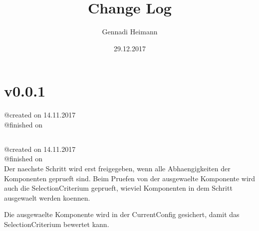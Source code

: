 \documentclass{article}
\begin{document}
\begin{titlepage}
\author{Gennadi Heimann} 
\title{Change Log} 
\date{29.12.2017} 
\maketitle
\end{titlepage}

\section{v0.0.1}
@created on 14.11.2017\\
@finished on \\

\subsection{}
@created on     14.11.2017\\
@finished on   \\

Der naechste Schritt wird erst freigegeben, wenn alle Abhaengigkeiten 
der Komponenten geprueft sind. Beim Pruefen von der ausgewaelte 
Komponente wird auch die SelectionCriterium geprueft, wieviel Komponenten 
in dem Schritt ausgewaelt werden koennen.

Die ausgewaelte Komponente wird in der CurrentConfig gesichert, damit das
SelectionCriterium bewertet kann.
\end{document}
